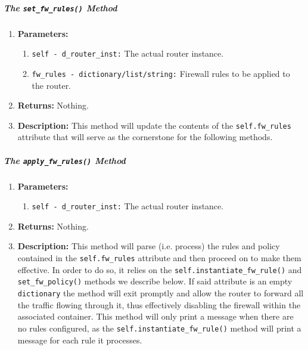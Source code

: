         \subparagraph{The \texttt{set\_fw\_rules()} Method}
            \begin{enumerate}
                \item \textbf{Parameters:}
                \begin{enumerate}
                    \item \texttt{self - d\_router\_inst:} The actual router instance.
                    \item \texttt{fw\_rules - dictionary/list/string:} Firewall rules to be applied to the router.
                \end{enumerate}
                \item \textbf{Returns:} Nothing.
                \item \textbf{Description:} This method will update the contents of the \texttt{self.fw\_rules} attribute that will serve as the cornerstone for the following methods.
            \end{enumerate}

        \subparagraph{The \texttt{apply\_fw\_rules()} Method}
            \begin{enumerate}
                \item \textbf{Parameters:}
                \begin{enumerate}
                    \item \texttt{self - d\_router\_inst:} The actual router instance.
                \end{enumerate}
                \item \textbf{Returns:} Nothing.
                \item \textbf{Description:} This method will parse (i.e. process) the rules and policy contained in the \texttt{self.fw\_rules} attribute and then proceed on to make them effective. In order to do so, it relies on the \texttt{self.instantiate\_fw\_rule()} and \texttt{set\_fw\_policy()} methods we describe below. If said attribute is an empty \texttt{dictionary} the method will exit promptly and allow the router to forward all the traffic flowing through it, thus effectively disabling the firewall within the associated container. This method will only print a message when there are no rules configured, as the \texttt{self.instantiate\_fw\_rule()} method will print a message for each rule it processes.
            \end{enumerate}

